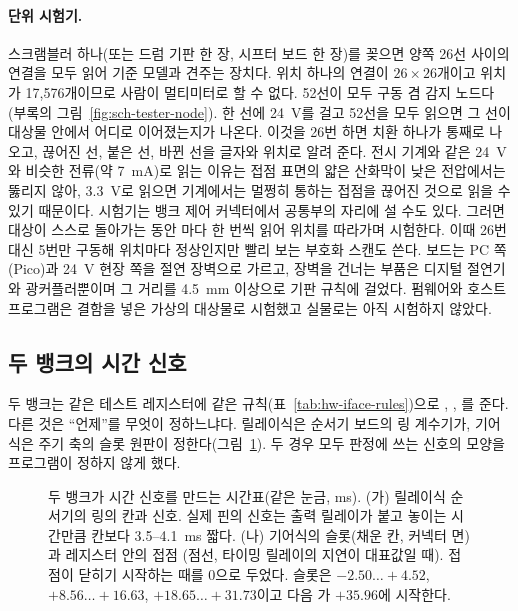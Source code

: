 \paragraph{단위 시험기.} 스크램블러 하나(또는 드럼 기판 한 장, 시프터 보드 한 장)를 꽂으면 양쪽 26선 사이의 연결을 모두
읽어 기준 모델과 견주는 장치다. 위치 하나의 연결이 $26 \times 26$개이고 위치가 17,576개이므로 사람이 멀티미터로 할 수
없다. 52선이 모두 구동 겸 감지 노드다(부록의 그림~\ref{fig:sch-tester-node}). 한 선에 24~V를 걸고 52선을 모두 읽으면
그 선이 대상물 안에서 어디로 이어졌는지가 나온다. 이것을 26번 하면 치환 하나가 통째로 나오고, 끊어진 선, 붙은 선,
바뀐 선을 글자와 위치로 알려 준다. 전시 기계와 같은 24~V와 비슷한 전류(약 7~mA)로 읽는 이유는 접점 표면의 얇은
산화막이 낮은 전압에서는 뚫리지 않아, 3.3~V로 읽으면 기계에서는 멀쩡히 통하는 접점을 끊어진 것으로 읽을 수 있기
때문이다. 시험기는 뱅크 제어 커넥터에서 공통부의 자리에 설 수도 있다. 그러면 대상이 스스로 돌아가는 동안
마다 한 번씩 읽어 위치를 따라가며 시험한다. 이때 26번 대신 5번만 구동해 위치마다 정상인지만 빨리 보는
부호화 스캔도 쓴다. 보드는 PC 쪽(Pico)과 24~V 현장 쪽을 절연 장벽으로 가르고, 장벽을 건너는 부품은 디지털 절연기와
광커플러뿐이며 그 거리를 4.5~mm 이상으로 기판 규칙에 걸었다. 펌웨어와 호스트 프로그램은 결함을 넣은 가상의 대상물로
시험했고 실물로는 아직 시험하지 않았다.

\subsection{두 뱅크의 시간 신호}\label{sec:hw-boards-timing}

두 뱅크는 같은 테스트 레지스터에 같은 규칙(표~\ref{tab:hw-iface-rules})으로 , , 를
준다. 다른 것은 ``언제''를 무엇이 정하느냐다. 릴레이식은 순서기 보드의 링 계수기가, 기어식은 주기 축의 슬롯 원판이
정한다(그림~\ref{fig:hw-timing-banks}). 두 경우 모두 판정에 쓰는 신호의 모양을 프로그램이 정하지 않게 했다.

\begin{figure}[ht]
\centering

\caption{두 뱅크가 시간 신호를 만드는 시간표(같은 눈금, ms). (가) 릴레이식 순서기의 링의 칸과 신호. 실제 핀의 신호는 출력
릴레이가 붙고 놓이는 시간만큼 칸보다 3.5--4.1~ms 짧다. (나) 기어식의 슬롯(채운 칸, 커넥터 면)과 레지스터 안의 접점
(점선, 타이밍 릴레이의 지연이 대표값일 때).  접점이 닫히기 시작하는 때를 0으로 두었다. 슬롯은 
$-2.50 \dots +4.52$,  $+8.56 \dots +16.63$,  $+18.65 \dots +31.73$이고 다음 가 $+35.96$에
시작한다.}
\label{fig:hw-timing-banks}
\end{figure}

